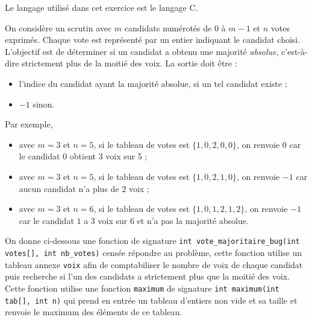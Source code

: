 \documentclass[11pt,a4paper]{article}
\begin{document}
\begin{Exercise}[title = {Algorithme de recherche de la majorité absolue} ]


    
Le langage utilisé dans cet exercice est le langage C.

\medskip



On considère un scrutin avec $m$ candidats numérotés de $0$ à $m-1$ et $n$ votes exprimés. Chaque vote est représenté par un entier indiquant le candidat choisi. 
L'objectif est de déterminer si un candidat a obtenu une majorité \textit{absolue}, c'est-à-dire strictement plus de la moitié des voix. La sortie doit être :
\begin{itemize}
    \item l'indice du candidat ayant la majorité absolue, si un tel candidat existe ;
    \item $-1$ sinon.
\end{itemize}

Par exemple,
\begin{itemize}
    \item avec $m=3$ et $n=5$, si le tableau de votes est $\{1, 0, 2, 0, 0\}$, on renvoie $0$ car le candidat $0$ obtient 3 voix sur 5 ;
    \item avec $m=3$ et $n=5$, si le tableau de votes est $\{1, 0, 2, 1, 0\}$, on renvoie $-1$ car aucun candidat n'a plus de 2 voix ;
    \item avec $m=3$ et $n=6$, si le tableau de votes est $\{1, 0, 1, 2, 1, 2\}$, on renvoie $-1$ car le candidat $1$ a 3 voix sur 6 et n'a pas la majorité absolue.
\end{itemize}

On donne ci-dessous une fonction de signature \texttt{int vote_majoritaire_bug(int votes[], int nb_votes)} censée répondre au problème, cette fonction utilise un tableau annexe {\tt voix} afin de comptabiliser le nombre de voix de chaque candidat puis recherche si l'un des candidats a strictement plus que la moitié des voix.
Cette fonction utilise une fonction {\tt maximum} de signature \texttt{int maximum(int tab[], int n)} qui prend en entrée un tableau d'entiers non vide et sa taille et renvoie le maximum des éléments de ce tableau.




\end{Exercise}
\end{document}
